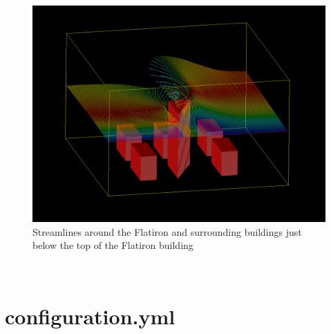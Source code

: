 \begin{figure}[hp]
\centering
\includegraphics[width = \textwidth]{streamlinestop.png}
\caption{Streamlines around the Flatiron and surrounding buildings just below the top of the Flatiron building}
\label{fig:streamlinestop}
\end{figure}\\
%
%
\clearpage\section{configuration.yml}
